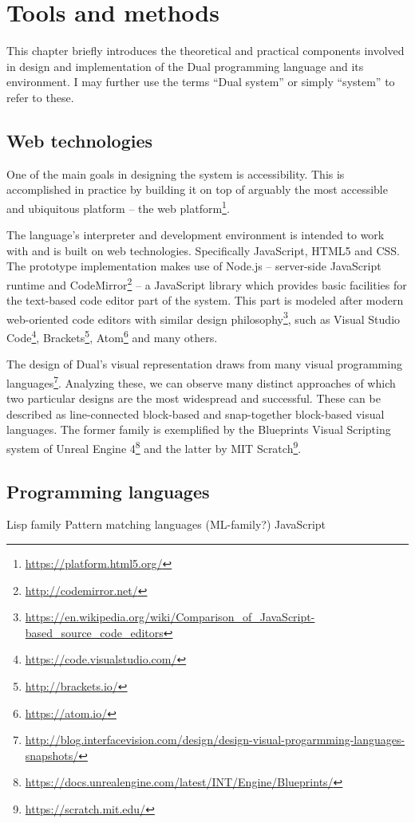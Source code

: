 \chapter{Tools and methods}\label{chap:tools}

This chapter briefly introduces the theoretical and practical components involved in design and implementation of the Dual programming language and its environment. I may further use the terms ``Dual system'' or simply ``system'' to refer to these.

\section{Web technologies}
One of the main goals in designing the system is accessibility. This is accomplished in practice by building it on top of arguably the most accessible and ubiquitous platform -- the web platform\footnote{\url{https://platform.html5.org/}}.

The language's interpreter and development environment is intended to work with and is built on web technologies. Specifically JavaScript, HTML5 and CSS. The prototype implementation makes use of Node.js -- server-side JavaScript runtime and CodeMirror\footnote{\url{http://codemirror.net/}} -- a JavaScript library which provides basic facilities for the text-based code editor part of the system. This part is modeled after modern web-oriented code editors with similar design philosophy\footnote{\url{https://en.wikipedia.org/wiki/Comparison_of_JavaScript-based_source_code_editors}}, such as Visual Studio Code\footnote{\url{https://code.visualstudio.com/}}, Brackets\footnote{\url{http://brackets.io/}}, Atom\footnote{\url{https://atom.io/}} and many others.

The design of Dual's visual representation draws from many visual programming languages\footnote{\url{
http://blog.interfacevision.com/design/design-visual-progarmming-languages-snapshots/}}. Analyzing these, we can observe many distinct approaches of which two particular designs are the most widespread and successful. These can be described as line-connected block-based and snap-together block-based visual languages. The former family is exemplified by the Blueprints Visual Scripting system of Unreal Engine 4\footnote{\url{https://docs.unrealengine.com/latest/INT/Engine/Blueprints/}} and the latter by MIT Scratch\footnote{\url{https://scratch.mit.edu/}}.

\section{Programming languages}
Lisp family
Pattern matching languages (ML-family?)
JavaScript





